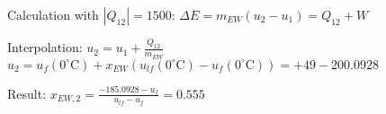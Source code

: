 Calculation with \( |Q_{12}| = 1500 \):  
\( \Delta E = m_{EW} (u_2 - u_1) = Q_{12} + W \)  

Interpolation:  
\( u_2 = u_1 + \frac{Q_{12}}{m_{EW}} \)  
\( u_2 = u_f(0^\circ \text{C}) + x_{EW} (u_{lf}(0^\circ \text{C}) - u_f(0^\circ \text{C})) = +49 - 200.0928 \)  

Result:  
\( x_{EW,2} = \frac{-185.0928 - u_f}{u_{lf} - u_f} = 0.555 \)